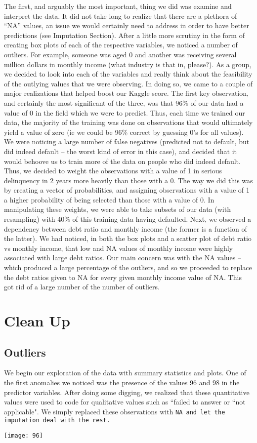\documentclass[11pt, oneside]{article}   	%
\begin{document}
The first, and arguably the most important, thing we did was examine and interpret the data. It did not take long to realize that there are a plethora of “NA” values, an issue we would certainly need to address in order to have better predictions (see Imputation Section). After a little more scrutiny in the form of creating box plots of each of the respective variables, we noticed a number of outliers. For example, someone was aged 0 and another was receiving several million dollars in monthly income (what industry is that in, please?). As a group, we decided to look into each of the variables and really think about the feasibility of the outlying values that we were observing. In doing so, we came to a couple of major realizations that helped boost our Kaggle score. 
The first key observation, and certainly the most significant of the three, was that 96\% of our data had a value of 0 in the field which we were to predict. Thus, each time we trained our data, the majority of the training was done on observations that would ultimately yield a value of zero (ie we could be 96\% correct by guessing 0’s for all values). We were noticing a large number of false negatives (predicted not to default, but did indeed default – the worst kind of error in this case), and decided that it would behoove us to train more of the data on people who did indeed default. Thus, we decided to weight the observations with a value of 1 in serious delinquency in 2 years more heavily than those with a 0. The way we did this was by creating a vector of probabilities, and assigning observations with a value of 1 a higher probability of being selected than those with a value of 0. In manipulating these weights, we were able to take subsets of our data (with resampling) with 40\% of this training data having defaulted. 
Next, we observed a dependency between debt ratio and monthly income (the former is a function of the latter). We had noticed, in both the box plots and a scatter plot of debt ratio vs monthly income, that low and NA values of monthly income were highly associated with large debt ratios. Our main concern was with the NA values – which produced a large percentage of the outliers, and so we proceeded to replace the debt ratios given to NA for every given monthly income value of NA. This got rid of a large number of the number of outliers.

\section{Clean Up}
	\subsection{Outliers}
	We begin our exploration of the data with summary statistics and plots. One of 
	the first anomalies we noticed was the presence of the values $96$ and $98$ 
	in the predictor variables. After doing some digging, we realized that 
	these quantitative values were used to code for qualitative values such as 
	``failed to answer or ``not applicable". We simply replaced these observations with
	\tt NA\rm~and let the imputation deal with the rest.
	\begin{center}
	\texttt{[image: 96]}
	\end{center}
	
\end{document}
